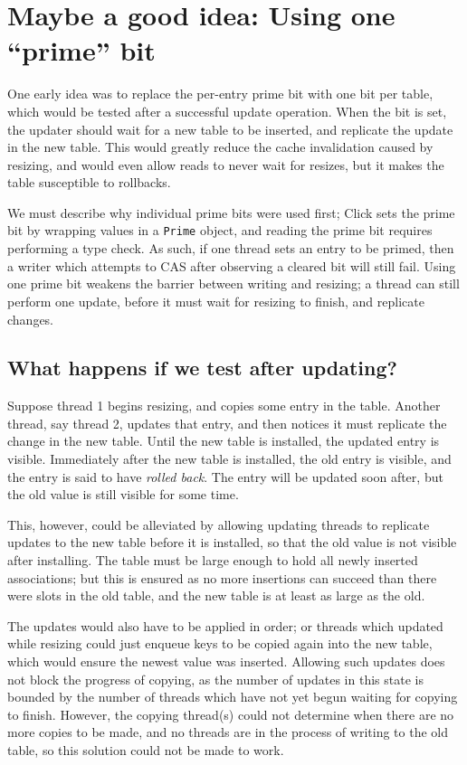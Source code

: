 \documentclass{article}
\begin{document}
\section{Maybe a good idea: Using one ``prime'' bit}

One early idea was to replace the per-entry prime bit with one bit per
table, which would be tested after a successful update operation. When
the bit is set, the updater should wait for a new table to be
inserted, and replicate the update in the new table. This would
greatly reduce the cache invalidation caused by resizing, and would
even allow reads to never wait for resizes, but it makes the table
susceptible to rollbacks.

We must describe why individual prime bits were used first; Click
sets the prime bit by wrapping values in a \texttt{Prime} object, and
reading the prime bit requires performing a type check. As such, if one
thread sets an entry to be primed, then a writer which attempts to CAS
after observing a cleared bit will still fail. Using one prime bit
weakens the barrier between writing and resizing; a thread can still
perform one update, before it must wait for resizing to finish, and
replicate changes.

\subsection{What happens if we test after updating?}

Suppose thread 1 begins resizing, and copies some entry in the table.
Another thread, say thread 2, updates that entry, and then notices
it must replicate the change in the new table. Until the new table is
installed, the updated entry is visible. Immediately after the new table
is installed, the old entry is visible, and the entry is said to have
\emph{rolled back}. The entry will be updated soon after, but the old
value is still visible for some time.

This, however, could be alleviated by allowing updating threads to
replicate updates to the new table before it is installed, so that the
old value is not visible after installing. The table must be large
enough to hold all newly inserted associations; but this is ensured as
no more insertions can succeed than there were slots in the old table,
and the new table is at least as large as the old.

The updates would also have to be applied in order; or threads which
updated while resizing could just enqueue keys to be copied again into
the new table, which would ensure the newest value was
inserted. Allowing such updates does not block the progress of
copying, as the number of updates in this state is bounded by the
number of threads which have not yet begun waiting for copying to
finish. However, the copying thread(s) could not determine when there
are no more copies to be made, and no threads are in the process of
writing to the old table, so this solution could not be made to work.
\end{document}
